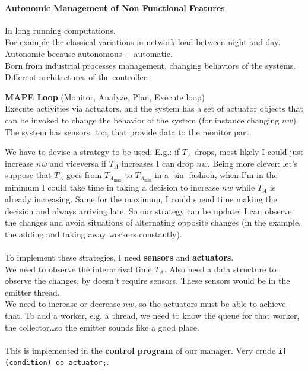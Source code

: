 \documentclass[10pt]{report}
\begin{document}
\paragraph{Autonomic Management of Non Functional Features} In long running computations.\\
For example the classical variations in network load between night and day. Autonomic because autonomous + automatic.\\
Born from industrial processes management, changing behaviors of the systems. Different architectures of the controller:
\begin{list}{}{}
	\item \textbf{MAPE Loop} (Monitor, Analyze, Plan, Execute loop)\\
	Execute activities via actuators, and the system has a set of actuator objects that can be invoked to change the behavior of the system (for instance changing $nw$). The system has sensors, too, that provide data to the monitor part.
\end{list}
We have to devise a strategy to be used. E.g.: if $T_A$ drops, most likely I could just increase $nw$ and viceversa if $T_A$ increases I can drop $nw$. Being more clever: let's suppose that $T_A$ goes from $T_{A_{\max}}$ to $T_{A_{\min}}$ in a $\sin$ fashion, when I'm in the minimum I could take time in taking a decision to increase $nw$ while $T_A$ is already increasing. Same for the maximum, I could spend time making the decision and always arriving late. So our strategy can be update: I can observe the changes and avoid situations of alternating opposite changes (in the example, the adding and taking away workers constantly).\\\\
To implement these strategies, I need \textbf{sensors} and \textbf{actuators}.\\
We need to observe the interarrival time $T_A$. Also need a data structure to observe the changes, by doesn't require sensors. These sensors would be in the emitter thread.\\
We need to increase or decrease $nw$, so the actuators must be able to achieve that. To add a worker, e.g. a thread, we need to know the queue for that worker, the collector\ldots so the emitter sounds like a good place.\\\\
This is implemented in the \textbf{control program} of our manager. Very crude \texttt{if (condition) do actuator;}.
\end{document}
